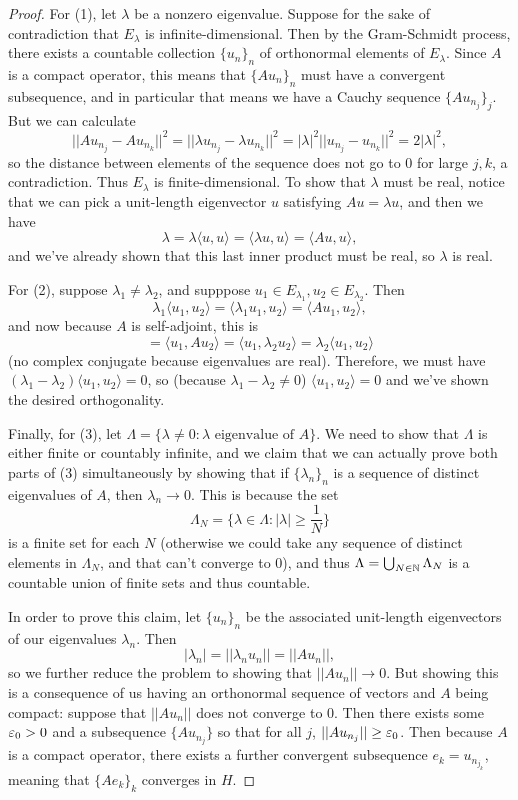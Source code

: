 \begin{proof}
For (1), let $\lambda$ be a nonzero eigenvalue. Suppose for the sake of contradiction that $E_\lambda$ is infinite-dimensional. Then by the Gram-Schmidt process, there exists a countable collection $\{u_n\}_n$ of orthonormal elements of $E_{\lambda}$. Since $A$ is a compact operator, this means that $\{Au_n\}_n$ must have a convergent subsequence, and in particular that means we have a Cauchy sequence $\{Au_{n_j}\}_j$. But we can calculate
\[
    ||Au_{n_j} - Au_{n_k}||^2 = ||\lambda u_{n_j} - \lambda u_{n_k}||^2 = |\lambda|^2 ||u_{n_j} - u_{n_k}||^2 = 2|\lambda|^2,
\]
so the distance between elements of the sequence does not go to $0$ for large $j, k$, a contradiction. Thus $E_\lambda$ is finite-dimensional. To show that $\lambda$ must be real, notice that we can pick a unit-length eigenvector $u$ satisfying $Au = \lambda u$, and then we have
\[
    \lambda = \lambda \langle u, u \rangle = \langle \lambda u, u \rangle = \langle Au, u \rangle,
\]
and we've already shown that this last inner product must be real, so $\lambda$ is real.

For (2), suppose $\lambda_1 \ne \lambda_2$, and supppose $u_1 \in E_{\lambda_1}, u_2 \in E_{\lambda_2}$. Then 
\[
    \lambda_1 \langle u_1, u_2 \rangle = \langle \lambda_1 u_1, u_2 \rangle = \langle Au_1, u_2 \rangle,
\]
and now because $A$ is self-adjoint, this is 
\[
    = \langle u_1, Au_2 \rangle = \langle u_1, \lambda_2 u_2 \rangle = \lambda_2 \langle u_1, u_2 \rangle
\]
(no complex conjugate because eigenvalues are real). Therefore, we must have $(\lambda_1 - \lambda_2) \langle u_1, u_2 \rangle = 0$, so (because $\lambda_1 - \lambda_2 \ne 0$) $\langle u_1, u_2 \rangle = 0$ and we've shown the desired orthogonality. 

Finally, for (3), let $\Lambda = \{\lambda \ne 0: \lambda \text{ eigenvalue of }A\}$. We need to show that $\Lambda$ is either finite or countably infinite, and we claim that we can actually prove both parts of (3) simultaneously by showing that if $\{\lambda_n\}_n$ is a sequence of distinct eigenvalues of $A$, then $\lambda_n \to 0$. This is because the set
\[
    \Lambda_N = \{\lambda \in \Lambda: |\lambda| \ge \frac{1}{N}\}
\]
is a finite set for each $N$ (otherwise we could take any sequence of distinct elements in $\Lambda_N$, and that can't converge to $0$), and thus $\Lambda = \bigcup_{N \in \mathbb N} \Lambda_N$ is a countable union of finite sets and thus countable. 

In order to prove this claim, let $\{u_n\}_n$ be the associated unit-length eigenvectors of our eigenvalues $\lambda_n$. Then 
\[
    |\lambda_n| = ||\lambda_n u_n|| = ||Au_n||,
\]
so we further reduce the problem to showing that $||Au_n|| \to 0$. But showing this is a consequence of us having an orthonormal sequence of vectors and $A$ being compact: suppose that $||Au_n||$ does not converge to $0$. Then there exists some $\varepsilon_0 > 0$ and a subsequence $\{Au_{n_j}\}$ so that for all $j$, $||Au_{n_j}|| \ge \varepsilon_0$. Then because $A$ is a compact operator, there exists a further convergent subsequence $e_k = u_{n_{j_k}}$, meaning that $\{Ae_k\}_k$ converges in $H$. 


\end{proof}
